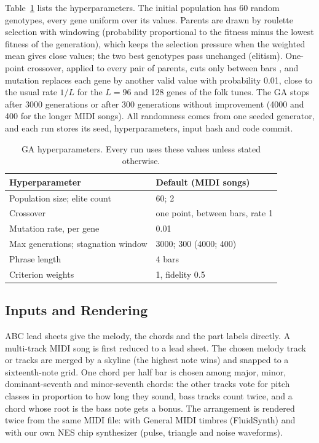 \documentclass{article}
\begin{document}
Table~\ref{tab:hyper} lists the hyperparameters. The initial population has 60 random genotypes,
every gene uniform over its values. Parents are drawn by roulette selection with
windowing (probability proportional to the fitness minus the lowest fitness of the generation),
which keeps the selection pressure when the weighted mean gives close values; the two best
genotypes pass unchanged (elitism). One-point crossover, applied to every pair of parents, cuts
only between bars \cite{freitas2011melody}, and mutation replaces each gene by another valid value
with probability 0.01, close to the usual rate $1/L$ \cite{ozcan2008genetic,scirea2017affective}
for the $L = 96$ and 128 genes of the folk tunes. The GA stops after 3000 generations or after 300
generations without improvement (4000 and 400 for the longer MIDI songs). All randomness comes
from one seeded generator, and each run stores its seed, hyperparameters, input hash and code
commit.

\begin{table}[t]
 \centering
 \footnotesize
 \begin{tabular}{@{}ll@{}}
  \toprule
  Hyperparameter & Default (MIDI songs) \\
  \midrule
  Population size; elite count & 60; 2 \\
  Crossover & one point, between bars, rate 1 \\
  Mutation rate, per gene & 0.01 \\
  Max generations; stagnation window & 3000; 300 (4000; 400) \\
  Phrase length & 4 bars \\
  Criterion weights & 1, fidelity 0.5 \\
  \bottomrule
 \end{tabular}
 \caption{GA hyperparameters. Every run uses these values unless stated otherwise.}
 \label{tab:hyper}
\end{table}

\subsection{Inputs and Rendering}

ABC lead sheets give the melody, the chords and the part labels directly. A multi-track MIDI song
is first reduced to a lead sheet. The chosen melody track or tracks are merged by a skyline (the
highest note wins) and snapped to a sixteenth-note grid. One chord per half bar is chosen among
major, minor, dominant-seventh and minor-seventh chords: the other tracks vote for pitch classes in
proportion to how long they sound, bass tracks count twice, and a chord whose root is the bass note
gets a bonus. The arrangement is rendered twice from the same MIDI file: with General MIDI
timbres (FluidSynth) and with our own NES chip synthesizer (pulse, triangle and noise waveforms).
\end{document}

